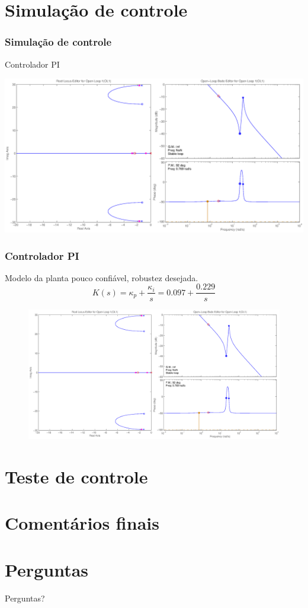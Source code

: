 \documentclass{beamer}
\begin{document}
\section{Simulação de controle}
\begin{frame}
	\frametitle{Simulação de controle}
	\begin{block}{Controlador PI}
		\begin{center}
		\end{center}
		\begin{center}
			\includegraphics[height=0.40\linewidth]{../sisotool}
		\end{center}
	\end{block}
\end{frame}
\begin{frame}
	\frametitle{Controlador PI}
	Modelo da planta pouco confiável, robustez desejada.
	\begin{equation*}
	K(s) = \kappa_p + \frac{\kappa_i}{s} = 0.097 + \frac{0.229}{s}
	\end{equation*}
	\begin{figure}
		\includegraphics[height=0.4\linewidth]{../sisotool}
	\end{figure}
\end{frame}
\section{Teste de controle}
\section{Comentários finais}
\section{Perguntas}
\begin{frame}
\Huge{\centerline{Perguntas?}}
\end{frame}

\end{document}
